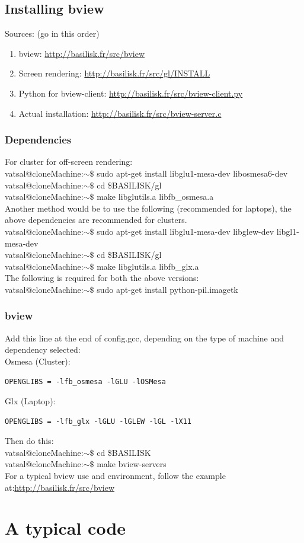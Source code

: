 \documentclass[]{article}
\newcommand\Colorhref[3][blue]{\href{#2}{\color{#1}#3}}
\begin{document}
\subsection{Installing bview}
Sources: (go in this order)
\begin{enumerate}
\item bview: \Colorhref{http://basilisk.fr/src/bview}{http://basilisk.fr/src/bview}
\item Screen rendering: \Colorhref{http://basilisk.fr/src/gl/INSTALL}{http://basilisk.fr/src/gl/INSTALL}
\item Python for bview-client: \Colorhref{http://basilisk.fr/src/bview-client.py}{http://basilisk.fr/src/bview-client.py}
\item Actual installation: \Colorhref{http://basilisk.fr/src/bview-server.c}{http://basilisk.fr/src/bview-server.c}
\end{enumerate}
\subsubsection{Dependencies}
For cluster for off-screen rendering:\\
{\color{red}vatsal@cloneMachine:$\sim\$$} sudo apt-get install libglu1-mesa-dev libosmesa6-dev\\
{\color{red}vatsal@cloneMachine:$\sim\$$} cd \$BASILISK/gl\\
{\color{red}vatsal@cloneMachine:$\sim\$$} make libglutils.a libfb\_osmesa.a\\
Another method would be to use the following (recommended for laptops), the above dependencies are recommended for clusters.\\
{\color{red}vatsal@cloneMachine:$\sim\$$} sudo apt-get install libglu1-mesa-dev libglew-dev libgl1-mesa-dev\\
{\color{red}vatsal@cloneMachine:$\sim\$$} cd \$BASILISK/gl\\
{\color{red}vatsal@cloneMachine:$\sim\$$} make libglutils.a libfb\_glx.a\\
The following is required for both the above versions:\\
{\color{red}vatsal@cloneMachine:$\sim\$$} sudo apt-get install python-pil.imagetk
\subsubsection{bview}
Add this line at the end of config.gcc, depending on the type of machine and dependency selected:\\
Osmesa (Cluster):
\begin{verbatim}
OPENGLIBS = -lfb_osmesa -lGLU -lOSMesa
\end{verbatim}
Glx (Laptop):
\begin{verbatim}
OPENGLIBS = -lfb_glx -lGLU -lGLEW -lGL -lX11
\end{verbatim}
Then do this:\\
{\color{red}vatsal@cloneMachine:$\sim\$$} cd \$BASILISK\\
{\color{red}vatsal@cloneMachine:$\sim\$$} make bview-servers\\
For a typical bview use and environment, follow the example at:\Colorhref{http://basilisk.fr/src/bview}{http://basilisk.fr/src/bview}
\section{A typical code}
\end{document}
